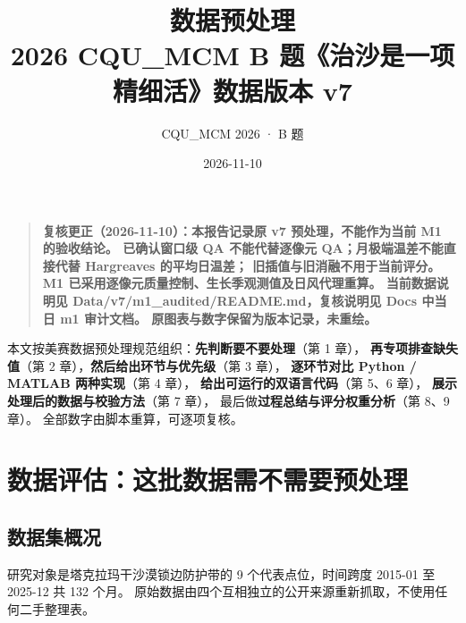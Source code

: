 \documentclass[11pt,a4paper]{ctexart}
\title{\bfseries 数据预处理\\[4pt]
\large 2026 CQU\_MCM B 题《治沙是一项精细活》\quad 数据版本 v7}
\author{CQU\_MCM 2026 · B 题}
\date{2026-11-10}
\begin{document}
\maketitle
\begin{quote}\small\bfseries
复核更正（2026-11-10）：本报告记录原 v7 预处理，不能作为当前 M1 的验收结论。
已确认窗口级 QA 不能代替逐像元 QA；月极端温差不能直接代替 Hargreaves 的平均日温差；
旧插值与旧消融不用于当前评分。M1 已采用逐像元质量控制、生长季观测值及日风代理重算。
当前数据说明见 Data/v7/m1\_audited/README.md，复核说明见 Docs 中当日 m1 审计文档。
原图表与数字保留为版本记录，未重绘。
\end{quote}

\thispagestyle{empty}

\begin{center}
\begin{minipage}{0.9\textwidth}
\small
本文按美赛数据预处理规范组织：\textbf{先判断要不要处理}（第 1 章），
\textbf{再专项排查缺失值}（第 2 章），\textbf{然后给出环节与优先级}（第 3 章），
\textbf{逐环节对比 Python / MATLAB 两种实现}（第 4 章），
\textbf{给出可运行的双语言代码}（第 5、6 章），
\textbf{展示处理后的数据与校验方法}（第 7 章），
最后做\textbf{过程总结与评分权重分析}（第 8、9 章）。
全部数字由脚本重算，可逐项复核。
\end{minipage}
\end{center}

\tableofcontents
\newpage

\section{数据评估：这批数据需不需要预处理}

\subsection{数据集概况}

研究对象是塔克拉玛干沙漠锁边防护带的 9 个代表点位，时间跨度 2015-01 至 2025-12 共 132 个月。
原始数据由四个互相独立的公开来源重新抓取，不使用任何二手整理表。
\end{document}
